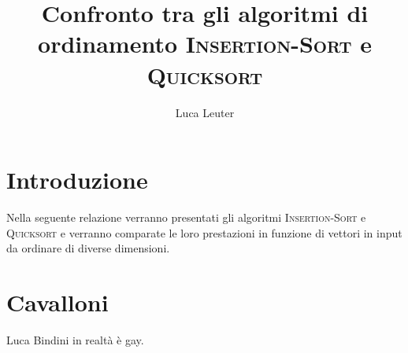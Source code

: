 \documentclass[11pt]{article}
\begin{document}
\title{\Large Confronto tra gli algoritmi di ordinamento \textsc{Insertion-Sort} e \textsc{Quicksort}}\date{}
\author{Luca Leuter}
\maketitle
\section{Introduzione}
Nella seguente relazione verranno presentati gli algoritmi \textsc{Insertion-Sort} e \textsc{Quicksort} e verranno comparate le loro prestazioni in funzione di vettori in input da ordinare di diverse dimensioni.
\section{Cavalloni}
Luca Bindini in realtà è gay.
\end{document}
